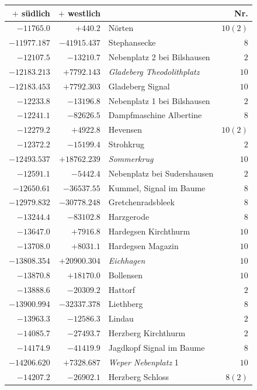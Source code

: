\clearpage{}%
\begin{center}\begingroup\fontsize{8}{9}\selectfont
\setlength{\tabcolsep}{4pt}
\begin{tabular}{r|r|p{170pt}|r}\hline
\(+\) südlich&\(+\) westlich&&Nr.\\\hline
\(-11765.0\)&\(+440.2\)&Nörten&\(10 (2)\)\\
\(-11977.187\)&\(-41915.437\)&Stephansecke&\(8\)\\
\(-12107.5\)&\(-13210.7\)&Nebenplatz 2 bei Bilshausen&\(2\)\\
\(-12183.213\)&\(+7792.143\)&\textit{Gladeberg Theodolithplatz}&\(10\)\\
\(-12183.453\)&\(+7792.303\)&Gladeberg Signal&\(10\)\\
\(-12233.8\)&\(-13196.8\)&Nebenplatz 1 bei Bilshausen&\(2\)\\
\(-12241.1\)&\(-82626.5\)&Dampfmaschine Albertine&\(8\)\\
\(-12279.2\)&\(+4922.8\)&Hevensen&\(10 (2)\)\\
\(-12372.2\)&\(-15199.4\)&Strohkrug&\(2\)\\
\(-12493.537\)&\(+18762.239\)&\textit{Sommerkrug}&\(10\)\\
\(-12591.1\)&\(-5442.4\)&Nebenplatz bei Sudershausen&\(2\)\\
\(-12650.61\)&\(-36537.55\)&Kummel, Signal im Baume&\(8\)\\
\(-12979.832\)&\(-30778.248\)&Gretchenradsbleek&\(8\)\\
\(-13244.4\)&\(-83102.8\)&Harzgerode&\(8\)\\
\(-13647.0\)&\(+7916.8\)&Hardegsen Kirchthurm&\(10\)\\
\(-13708.0\)&\(+8031.1\)&Hardegsen Magazin&\(10\)\\
\(-13808.354\)&\(+20900.304\)&\textit{Eichhagen}&\(10\)\\
\(-13870.8\)&\(+18170.0\)&Bollensen&\(10\)\\
\(-13888.6\)&\(-20309.2\)&Hattorf&\(2\)\\
\(-13900.994\)&\(-32337.378\)&Liethberg&\(8\)\\
\(-13963.3\)&\(-12586.3\)&Lindau&\(2\)\\
\(-14085.7\)&\(-27493.7\)&Herzberg Kirchthurm&\(2\)\\
\(-14174.9\)&\(-41419.9\)&Jagdkopf Signal im Baume&\(8\)\\
\(-14206.620\)&\(+7328.687\)&\textit{Weper Nebenplatz} 1&\(10\)\\
\(-14207.2\)&\(-26902.1\)&Herzberg Schloss&\(8 (2)\)\\

\end{tabular}
\end{center}
